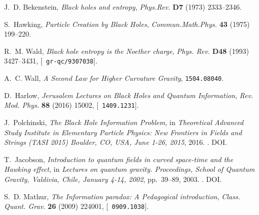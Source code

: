 \documentclass[12pt]{article}
\begin{document}
\providecommand{\href}[2]{#2}\begingroup\raggedright
\begin{thebibliography}{100}

J.~D. Bekenstein, \emph{{Black holes and entropy}},
  \href{http://dx.doi.org/10.1103/PhysRevD.7.2333}{\emph{Phys.Rev.} {\bf D7}
  (1973) 2333--2346}.

S.~Hawking, \emph{{Particle Creation by Black Holes}},
  \href{http://dx.doi.org/10.1007/BF02345020}{\emph{Commun.Math.Phys.} {\bf 43}
  (1975) 199--220}.

R.~M. Wald, \emph{{Black hole entropy is the Noether charge}},
  \href{http://dx.doi.org/10.1103/PhysRevD.48.R3427}{\emph{Phys. Rev.} {\bf
  D48} (1993) 3427--3431}, [\href{http://arxiv.org/abs/gr-qc/9307038}{{\tt
  gr-qc/9307038}}].

A.~C. Wall, \emph{{A Second Law for Higher Curvature Gravity}},
  \href{http://arxiv.org/abs/1504.08040}{{\tt 1504.08040}}.

D.~Harlow, \emph{{Jerusalem Lectures on Black Holes and Quantum Information}},
  \href{http://dx.doi.org/10.1103/RevModPhys.88.015002}{\emph{Rev. Mod. Phys.}
  {\bf 88} (2016) 15002}, [\href{http://arxiv.org/abs/1409.1231}{{\tt
  1409.1231}}].

J.~Polchinski, \emph{{The Black Hole Information Problem}},  in
  \emph{{Theoretical Advanced Study Institute in Elementary Particle Physics:
  New Frontiers in Fields and Strings (TASI 2015) Boulder, CO, USA, June 1-26,
  2015}}, 2016.
\newblock \href{http://arxiv.org/abs/1609.04036}{{\tt 1609.04036}}.
\newblock \href{http://dx.doi.org/10.1142/9789813149441_0006}{DOI}.

T.~Jacobson, \emph{{Introduction to quantum fields in curved space-time and the
  Hawking effect}},  in \emph{{Lectures on quantum gravity. Proceedings, School
  of Quantum Gravity, Valdivia, Chile, January 4-14, 2002}}, pp.~39--89, 2003.
\newblock \href{http://arxiv.org/abs/gr-qc/0308048}{{\tt gr-qc/0308048}}.
\newblock \href{http://dx.doi.org/10.1007/0-387-24992-3_2}{DOI}.

S.~D. Mathur, \emph{{The Information paradox: A Pedagogical introduction}},
  \href{http://dx.doi.org/10.1088/0264-9381/26/22/224001}{\emph{Class. Quant.
  Grav.} {\bf 26} (2009) 224001}, [\href{http://arxiv.org/abs/0909.1038}{{\tt
  0909.1038}}].


\end{thebibliography}
\end{document}

